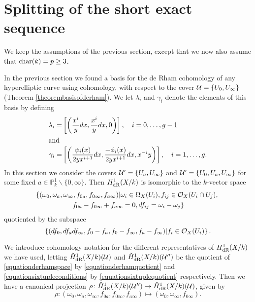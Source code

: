 
\section{Splitting of the short exact sequence}


We keep the assumptions of the previous section, except that we now also assume that $\operatorname{char}(k) = p \geq 3$.

In the previous section we found a basis for the de Rham cohomology of any hyperelliptic curve using \cech cohomology, with respect to the cover ${\mathcal U} = \{ U_0 , U_\infty\}$ (Theorem \ref{theorembasisofderham}).
We let $\lambda_i$ and $\gamma_i$ denote the elements of this basis by defining
    \begin{align*}
    \lambda_i  = & \left[ \left( \frac{x^i}{y}dx, \frac{x^i}{y}dx, 0\right) \right] ,\quad i=0, \ldots, g-1 \\
    \intertext{and}
    \gamma_i = & \left[ \left ( \frac{\psi_i(x)}{2yx^{i+1}}dx, \frac{-\phi_i(x)}{2yx^{i+1}}dx, x^{-i}y \right) \right], \quad i=1,\ldots ,g.
    \end{align*}
In this section we consider the covers ${\mathcal U}' = \{U_a, U_\infty\}$ and ${\mathcal U}' = \{U_0, U_a, U_\infty\}$ for some fixed $a \in \mathbb{P}_k^1\backslash \{0, \infty\}$.
Then $H_{\text {dR}}^1(X/k)$ is isomorphic to the $k$-vector space 
    \begin{multline}\label{equationsixtupleconditions}
    \left\{ (\omega_0, \omega_a, \omega_\infty , f_{0a}, f_{0 \infty},f_{a \infty}) | \omega_i \in \Omega_X(U_i), f_{ij} \in {\cal O}_X(U_i \cap U_j), \right. \\ \left. f_{0a} - f_{0\infty} + f_{a \infty} = 0, df_{ij} = \omega_i - \omega_j \right\}
    \end{multline}
quotiented by the subspace 
    \begin{equation}\label{equationsixtuplequotient}
    \left\{( df_0, df_a df_\infty, f_0- f_a, f_0 - f_\infty, f_a - f_\infty ) | f_i \in {\cal O}_X(U_i)\right\}.
    \end{equation}

We introduce \cech cohomology notation for the different representatives of $H_{\text {dR}}^1(X/k)$ we have used, letting $\check{H}_{\text {dR}}^1(X/k)({\mathcal U})$ and $\check{H}_{\text {dR}}^1(X/k)({\mathcal U}'')$ be the quotient of \eqref{equationderhamspace} by \eqref{equationderhamquotient} and \eqref{equationsixtupleconditions} by \eqref{equationsixtuplequotient} respectively.
Then we have a canonical projection $\rho\colon \check{H}_{\text {dR}}^1(X/k)({\mathcal U}'') \rightarrow \check{H}_{\text {dR}}^1(X/k)({\mathcal U})$, given by 
    \begin{equation}\label{equationdefinitionofrho}
    \rho \colon (\omega_0, \omega_a, \omega_\infty , f_{0a}, f_{0 \infty},f_{a \infty}) \mapsto (\omega_0, \omega_\infty , f_{0 \infty}).
    \end{equation}

